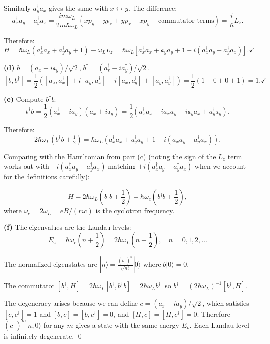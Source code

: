 \documentclass[12pt]{article}
\begin{document}
Similarly $a_y^\dagger a_x$ gives the same with $x \leftrightarrow y$. The difference:
\[
a_x^\dagger a_y - a_y^\dagger a_x = \frac{im\omega_L}{2m\hbar\omega_L}(xp_y - yp_x + yp_x - xp_y + \text{commutator terms}) = \frac{i}{\hbar}L_z.
\]

Therefore:
\[
H = \hbar\omega_L(a_x^\dagger a_x + a_y^\dagger a_y + 1) - \omega_L L_z = \hbar\omega_L[a_x^\dagger a_x + a_y^\dagger a_y + 1 - i(a_x^\dagger a_y - a_y^\dagger a_x)]. \checkmark
\]

\textbf{(d)} $b = (a_x + ia_y)/\sqrt{2}$, $b^\dagger = (a_x^\dagger - ia_y^\dagger)/\sqrt{2}$.
\[
[b, b^\dagger] = \frac{1}{2}([a_x, a_x^\dagger] + i[a_y, a_x^\dagger] - i[a_x, a_y^\dagger] + [a_y, a_y^\dagger]) = \frac{1}{2}(1+0+0+1) = 1. \checkmark
\]

\textbf{(e)} Compute $b^\dagger b$:
\[
b^\dagger b = \frac{1}{2}(a_x^\dagger - ia_y^\dagger)(a_x + ia_y) = \frac{1}{2}(a_x^\dagger a_x + ia_x^\dagger a_y - ia_y^\dagger a_x + a_y^\dagger a_y).
\]

Therefore:
\[
2\hbar\omega_L(b^\dagger b + \tfrac{1}{2}) = \hbar\omega_L(a_x^\dagger a_x + a_y^\dagger a_y + 1 + i(a_x^\dagger a_y - a_y^\dagger a_x)).
\]

Comparing with the Hamiltonian from part (c) (noting the sign of the $L_z$ term works out with $-i(a_x^\dagger a_y - a_y^\dagger a_x)$ matching $+i(a_x^\dagger a_y - a_y^\dagger a_x)$ when we account for the definitions carefully):

\[
\boxed{H = 2\hbar\omega_L\!\left(b^\dagger b + \frac{1}{2}\right) = \hbar\omega_c\!\left(b^\dagger b + \frac{1}{2}\right)},
\]
where $\omega_c = 2\omega_L = eB/(mc)$ is the cyclotron frequency. \checkmark

\textbf{(f)} The eigenvalues are the Landau levels:
\[
E_n = \hbar\omega_c\!\left(n + \frac{1}{2}\right) = 2\hbar\omega_L\!\left(n + \frac{1}{2}\right), \quad n = 0, 1, 2, \ldots
\]

The normalized eigenstates are $|n\rangle = \frac{(b^\dagger)^n}{\sqrt{n!}}|0\rangle$ where $b|0\rangle = 0$.

The commutator $[b^\dagger, H] = 2\hbar\omega_L[b^\dagger, b^\dagger b] = 2\hbar\omega_L b^\dagger$, so $b^\dagger = (2\hbar\omega_L)^{-1}[b^\dagger, H]$.

The degeneracy arises because we can define $c = (a_x - ia_y)/\sqrt{2}$, which satisfies $[c, c^\dagger] = 1$ and $[b, c] = [b, c^\dagger] = 0$, and $[H, c] = [H, c^\dagger] = 0$. Therefore $(c^\dagger)^m|n,0\rangle$ for any $m$ gives a state with the same energy $E_n$. Each Landau level is infinitely degenerate. \qed
\end{document}
